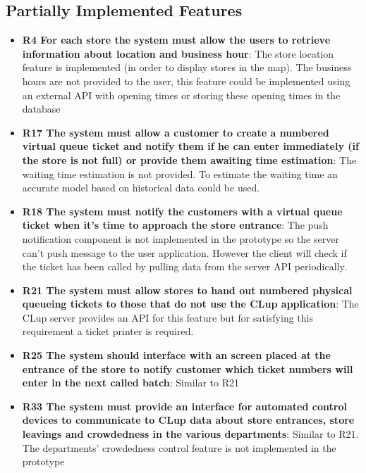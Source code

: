 \subsection{Partially Implemented Features}
\begin{itemize}
    \item \textbf{R4 For each store the system must allow the users to retrieve information about location and business hour}: The store location feature is implemented (in order to display stores in the map). The business hours are not provided to the user, this feature could be implemented using an external API with opening times or storing these opening times in the database
    \item \textbf{R17 The system must allow a customer to create a numbered virtual queue ticket and notify them if he can enter immediately (if the store is not full) or provide them awaiting time estimation}: The waiting time estimation is not provided. To estimate the waiting time an accurate model based on historical data could be used.
    \item \textbf{R18 The system must notify the customers with a virtual queue ticket when it’s time to approach the store entrance}:
    The push notification component is not implemented in the prototype so the server can't push message to the user application. However the client will check if the ticket has been called by pulling data from the server API periodically.
    \item \textbf{R21 The system must allow stores to hand out numbered physical queueing tickets to those that do not use the CLup application}:
    The CLup server provides an API for this feature but for satisfying this requirement a ticket printer is required. 
    \item \textbf{R25 The system should interface with an screen placed at the entrance of the store to notify customer which ticket numbers will enter in the next called batch}:
    Similar to R21
    \item \textbf{R33 The system must provide an interface for automated control devices to communicate to CLup data about store entrances, store leavings and crowdedness in the various departments}: Similar to R21. The departments' crowdedness control feature is not implemented in the prototype



\end{itemize}

